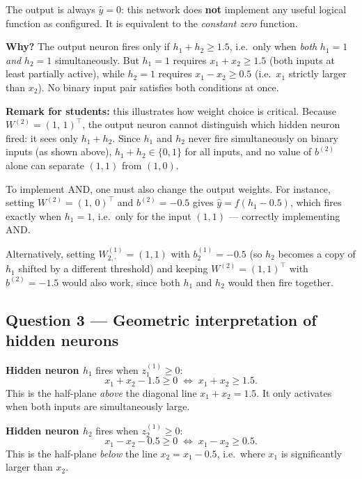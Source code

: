 \documentclass[11pt, a4paper]{article}
\begin{document}
\begin{tcolorbox}[answerbox, title={Answer}]
The output is always $\hat{y} = 0$: this network does \textbf{not} implement any useful logical
function as configured. It is equivalent to the \emph{constant zero} function.

\medskip
\textbf{Why?} The output neuron fires only if $h_1 + h_2 \geq 1.5$, i.e.\ only when
\emph{both} $h_1 = 1$ \emph{and} $h_2 = 1$ simultaneously. But $h_1 = 1$ requires
$x_1 + x_2 \geq 1.5$ (both inputs at least partially active), while $h_2 = 1$ requires
$x_1 - x_2 \geq 0.5$ (i.e.\ $x_1$ strictly larger than $x_2$). No binary input pair
satisfies both conditions at once.

\medskip
\textbf{Remark for students:} this illustrates how weight choice is critical.
Because $W^{(2)} = (1,\,1)^\top$, the output neuron cannot distinguish which hidden neuron
fired: it sees only $h_1 + h_2$. Since $h_1$ and $h_2$ never fire simultaneously on binary
inputs (as shown above), $h_1 + h_2 \in \{0, 1\}$ for all inputs, and no value of $b^{(2)}$
alone can separate $(1,1)$ from $(1,0)$.

To implement AND, one must also change the output weights. For instance, setting
$W^{(2)} = (1,\,0)^\top$ and $b^{(2)} = -0.5$ gives $\hat{y} = f(h_1 - 0.5)$,
which fires exactly when $h_1 = 1$, i.e.\ only for the input $(1,1)$ --- correctly
implementing AND.

Alternatively, setting $W^{(1)}_{2,\cdot} = (1, 1)$ with $b^{(1)}_2 = -0.5$ (so $h_2$
becomes a copy of $h_1$ shifted by a different threshold) and keeping $W^{(2)} = (1,1)^\top$
with $b^{(2)} = -1.5$ would also work, since both $h_1$ and $h_2$ would then fire together.
\end{tcolorbox}

\subsection*{Question 3 — Geometric interpretation of hidden neurons}

\textbf{Hidden neuron $h_1$} fires when $z_1^{(1)} \geq 0$:
\[
  x_1 + x_2 - 1.5 \geq 0 \;\Longleftrightarrow\; x_1 + x_2 \geq 1.5.
\]
This is the half-plane \emph{above} the diagonal line $x_1 + x_2 = 1.5$.
It only activates when both inputs are simultaneously large.

\vspace{0.5em}

\textbf{Hidden neuron $h_2$} fires when $z_2^{(1)} \geq 0$:
\[
  x_1 - x_2 - 0.5 \geq 0 \;\Longleftrightarrow\; x_1 - x_2 \geq 0.5.
\]
This is the half-plane \emph{below} the line $x_2 = x_1 - 0.5$, i.e.\ where $x_1$
is significantly larger than $x_2$.
\end{document}
